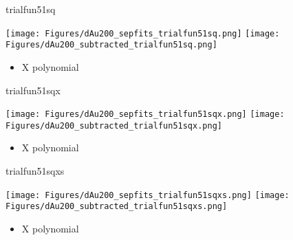 \documentclass[aspectratio=169,compress,10pt]{beamer}
\begin{document}
\begin{frame}{trialfun51sq}
\begin{center}
\texttt{[image: Figures/dAu200\_sepfits\_trialfun51sq.png]}
\texttt{[image: Figures/dAu200\_subtracted\_trialfun51sq.png]}
\end{center}
\begin{itemize}
\item X polynomial
\end{itemize}
\end{frame}




\begin{frame}{trialfun51sqx}
\begin{center}
\texttt{[image: Figures/dAu200\_sepfits\_trialfun51sqx.png]}
\texttt{[image: Figures/dAu200\_subtracted\_trialfun51sqx.png]}
\end{center}
\begin{itemize}
\item X polynomial
\end{itemize}
\end{frame}




\begin{frame}{trialfun51sqxs}
\begin{center}
\texttt{[image: Figures/dAu200\_sepfits\_trialfun51sqxs.png]}
\texttt{[image: Figures/dAu200\_subtracted\_trialfun51sqxs.png]}
\end{center}
\begin{itemize}
\item X polynomial
\end{itemize}
\end{frame}
\end{document}

